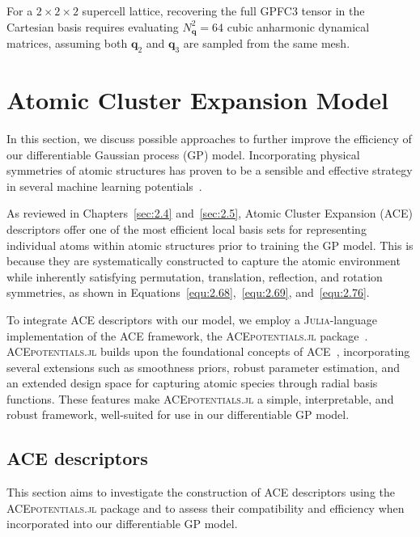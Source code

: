 For a \( 2 \times 2 \times 2 \) supercell lattice, recovering the full GPFC3 tensor in the Cartesian basis requires evaluating \( N_{\mathbf{q}}^2 = 64 \) cubic anharmonic dynamical matrices, assuming both \( \mathbf{q}_2 \) and \( \mathbf{q}_3 \) are sampled from the same mesh.


\section{Atomic Cluster Expansion Model} \label{sec:3.3}

In this section, we discuss possible approaches to further improve the efficiency of our differentiable Gaussian process (GP) model. Incorporating physical symmetries of atomic structures has proven to be a sensible and effective strategy in several machine learning potentials~\cite{Langer2022}.

As reviewed in Chapters~\ref{sec:2.4} and~\ref{sec:2.5}, Atomic Cluster Expansion (ACE) descriptors offer one of the most efficient local basis sets for representing individual atoms within atomic structures prior to training the GP model. This is because they are systematically constructed to capture the atomic environment while inherently satisfying permutation, translation, reflection, and rotation symmetries, as shown in Equations~\eqref{equ:2.68},~\eqref{equ:2.69}, and~\eqref{equ:2.76}.

To integrate ACE descriptors with our model, we employ a \textsc{Julia}-language implementation of the ACE framework, the \textsc{ACEpotentials.jl} package~\cite{Witt2023}. \textsc{ACEpotentials.jl} builds upon the foundational concepts of ACE~\cite{Drautz2019, Dusson2022}, incorporating several extensions such as smoothness priors, robust parameter estimation, and an extended design space for capturing atomic species through radial basis functions.
These features make \textsc{ACEpotentials.jl} a simple, interpretable, and robust framework, well-suited for use in our differentiable GP model.

\subsection{ACE descriptors} \label{subsec:3.3.1}

This section aims to investigate the construction of ACE descriptors using the \textsc{ACEpotentials.jl} package and to assess their compatibility and efficiency when incorporated into our differentiable GP model. 


